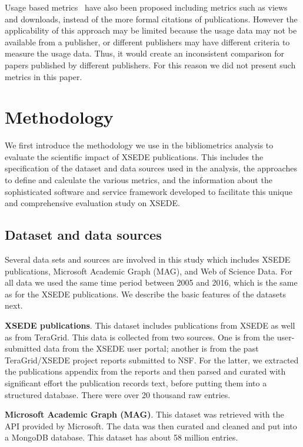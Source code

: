 \documentclass[sigconf]{acmart}
\begin{document}
Usage based
metrics~\cite{Bollen:2007:MUM:1255175.1255273,Bollen:2008:TUI:1378889.1378928}
have also been proposed including metrics such as views and downloads,
instead of the more formal citations of publications. However the
applicability of this approach may be limited because the usage data
may not be available from a publisher, or different publishers may
have different criteria to measure the usage data. Thus, it would
create an inconsistent comparison for papers published by different
publishers.  For this reason we did not present such metrics in this
paper.

\section{Methodology} \label{S:methodology}

We first introduce the methodology we use in the bibliometrics
analysis to evaluate the scientific impact of XSEDE publications. This
includes the specification of the dataset and data sources used in the
analysis, the approaches to define and calculate the various metrics,
and the information about the sophisticated software and service
framework developed to facilitate this unique and
comprehensive evaluation study on XSEDE.

\subsection{Dataset and data sources}

Several data sets and sources are involved in this study which
includes XSEDE publications, Microsoft Academic Graph (MAG), and Web
of Science Data. For all data we used the same time period between
2005 and 2016, which is the same as for the XSEDE publications. We
describe the basic features of the datasets next.

\parindent 0pt \textbf{XSEDE publications}. This dataset includes
publications from XSEDE as well as from TeraGrid.  This data is
collected from two sources. One is from the user-submitted data from
the XSEDE user portal; another is from the past TeraGrid/XSEDE project
reports submitted to NSF. For the latter, we extracted the
publications appendix from the reports and then parsed and curated
with significant effort the publication records text, before putting
them into a structured database. There were over 20 thousand raw
entries.

\parindent 0pt \textbf{Microsoft Academic Graph (MAG)}. This dataset
was retrieved with the API provided by Microsoft. The data was then
curated and cleaned and put into a MongoDB database. This dataset has
about 58 million entries.
\end{document}
